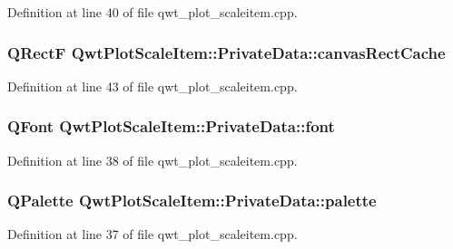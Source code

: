 Definition at line 40 of file qwt\-\_\-plot\-\_\-scaleitem.\-cpp.

\hypertarget{class_qwt_plot_scale_item_1_1_private_data_aadc2ce26d26aab57a45253dc16b908c4}{
\subsubsection[{canvas\-Rect\-Cache}]{\setlength{\rightskip}{0pt plus 5cm}Q\-Rect\-F Qwt\-Plot\-Scale\-Item\-::\-Private\-Data\-::canvas\-Rect\-Cache}}\label{class_qwt_plot_scale_item_1_1_private_data_aadc2ce26d26aab57a45253dc16b908c4}


Definition at line 43 of file qwt\-\_\-plot\-\_\-scaleitem.\-cpp.

\hypertarget{class_qwt_plot_scale_item_1_1_private_data_ad257eb57dbba476fee168b9a94824b9d}{
\subsubsection[{font}]{\setlength{\rightskip}{0pt plus 5cm}Q\-Font Qwt\-Plot\-Scale\-Item\-::\-Private\-Data\-::font}}\label{class_qwt_plot_scale_item_1_1_private_data_ad257eb57dbba476fee168b9a94824b9d}


Definition at line 38 of file qwt\-\_\-plot\-\_\-scaleitem.\-cpp.

\hypertarget{class_qwt_plot_scale_item_1_1_private_data_a5fe2af7f269b10c603d0f31abbe0062a}{
\subsubsection[{palette}]{\setlength{\rightskip}{0pt plus 5cm}Q\-Palette Qwt\-Plot\-Scale\-Item\-::\-Private\-Data\-::palette}}\label{class_qwt_plot_scale_item_1_1_private_data_a5fe2af7f269b10c603d0f31abbe0062a}


Definition at line 37 of file qwt\-\_\-plot\-\_\-scaleitem.\-cpp.

